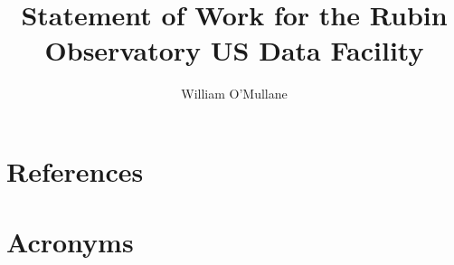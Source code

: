 \documentclass[OPS,authoryear,toc]{lsstdoc}
\title{Statement of Work for the Rubin Observatory US Data Facility}
\author{%
William O'Mullane
}
\date{\vcsDate}
\begin{document}
\maketitle


\appendix
\section{References} \label{sec:bib}
\renewcommand{\refname}{} %


\section{Acronyms} \label{sec:acronyms}

\end{document}
